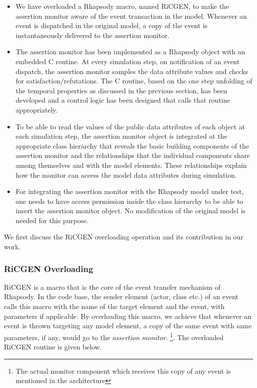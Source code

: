 \begin{itemize}

\item We have overloaded a Rhapsody macro, named RiCGEN, to make the 
assertion monitor aware of the event transaction in the model. Whenever 
an event 
is dispatched in the original model, a copy of the event is instantaneously 
delivered to the assertion monitor.

\item The assertion monitor has been implemented as a Rhapsody object with an 
embedded C routine. At every simulation step, on notification of an 
event dispatch, the assertion monitor samples the data attribute values 
and checks for satisfaction/refutations. The C routine, based on the 
one step unfolding of the temporal properties as discussed in the 
previous section, has been developed and a 
control logic has been designed that calls that routine appropriately. 

\item To be able to read the values of the public data attributes of each 
object at each simulation step, the assertion monitor object is integrated 
at the appropriate class hierarchy that reveals the basic building components 
of the assertion monitor and the relationships that the individual components 
share among themselves and with the model elements. These relationships explain 
how the monitor can access the model data attributes during simulation. 

\item For integrating the assertion monitor with the Rhapsody model under 
test, one needs to have access permission inside the class hierarchy 
to be able to insert the assertion monitor object. No modification of the 
original model is needed for this purpose. 
\end{itemize}

\noindent
We first discuss the RiCGEN overloading operation and its contribution in our
work. 

\subsubsection{RiCGEN Overloading} 
RiCGEN is a macro that is the core of the event transfer mechanism of Rhapsody.
In the code base, the sender element (actor, class etc.) of an event calls this
 macro with the name of the target element and the event, with parameters if
applicable. By overloading this macro, we achieve that whenever an event is 
thrown targeting any model element, a copy of the same event with same 
parameters, if any, would go to the {\em assertion monitor}.
\footnote{The actual monitor component which receives this copy of any event 
is mentioned in the architecture}. The overloaded RiCGEN routine 
is given below.

